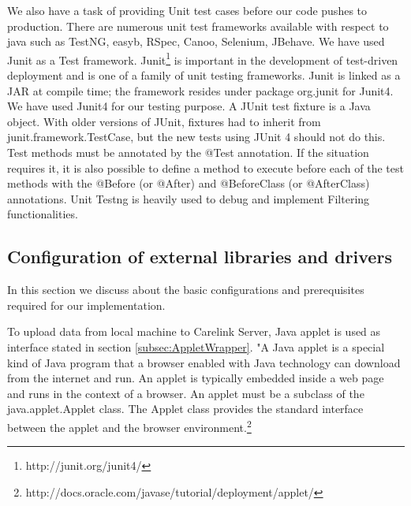 \documentclass[article,type=msc,colorback,accentcolor=tud9c,twoside,11pt]{tudthesis}
\begin{document}
We also have a task of providing Unit test cases before our code pushes to production. There are numerous unit test frameworks available with respect to java such as TestNG, easyb, RSpec, Canoo, Selenium, JBehave. We have used Junit as a Test framework. Junit\footnote{http://junit.org/junit4/} is important in the development of test-driven deployment and is one of a family of unit testing frameworks. Junit is linked as a JAR at compile time; the framework resides under package org.junit for Junit4. We have used Junit4 for our testing purpose. A JUnit test fixture is a Java object. With older versions of JUnit, fixtures had to inherit from junit.framework.TestCase, but the new tests using JUnit 4 should not do this. Test methods must be annotated by the @Test annotation. If the situation requires it, it is also possible to define a method to execute before  each of the test methods with the @Before (or @After) and @BeforeClass (or @AfterClass) annotations. Unit Testng is heavily used to debug and implement Filtering functionalities.
\clearpage

\subsection{Configuration of external libraries and drivers}
In this section we discuss about the basic configurations and prerequisites required for our implementation.


To upload data from local machine to Carelink Server, Java applet is  used as interface stated in section \ref{subsec:AppletWrapper}. "A Java applet is a special kind of Java program that a browser enabled with Java technology can download from the internet and run. An applet is typically embedded inside a web page and runs in the context of a browser. An applet must be a subclass of the java.applet.Applet class. The Applet class provides the standard interface between the applet and the browser environment.\footnote{http://docs.oracle.com/javase/tutorial/deployment/applet/}
\end{document}
